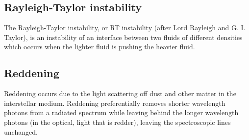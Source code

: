 \documentclass[11pt]{article}
\begin{document}
\subsection*{Rayleigh-Taylor instability}
The Rayleigh-Taylor instability, or RT instability (after Lord
Rayleigh and G. I. Taylor), is an instability of an interface between
two fluids of different densities which occurs when the lighter fluid
is pushing the heavier fluid.


\subsection*{Reddening}
Reddening occurs due to the light scattering off dust and other matter in the interstellar medium. 
Reddening preferentially removes shorter wavelength photons from a radiated spectrum while leaving behind the longer wavelength photons (in the optical, light that is redder), leaving the spectroscopic lines unchanged.
\end{document}
